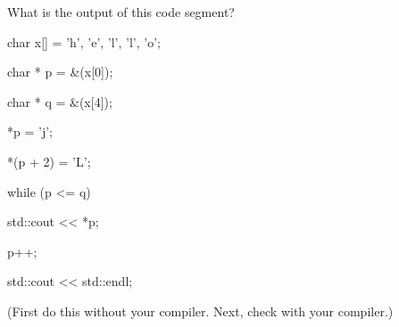 What is the output of this code segment?



\begin{consolethree}[escapeinside=||]

char x[] = {'h', 'e', 'l', 'l', 'o'};

char * p = &(x[0]);

char * q = &(x[4]);

*p = 'j';

*(p + 2) = 'L';

while (p <= q)

{

    std::cout << *p;

    p++;

}

std::cout << std::endl;

\end{consolethree}



(First do this without your compiler. Next, check with your compiler.)

